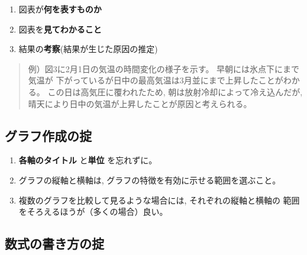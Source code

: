 \documentclass[12pt, ]{jsarticle}
\providecommand{\tightlist}{%
   \setlength{\itemsep}{0pt}\setlength{\parskip}{0pt}}
\begin{document}
\begin{enumerate}
  \begin{enumerate}
  \tightlist
  \item
    図表が\textbf{何を表すものか}
  \item
    図表を\textbf{見てわかること}
  \item
    結果の\textbf{考察}(結果が生じた原因の推定)
  \end{enumerate}

  \begin{quote}
  例）図3に2月1日の気温の時間変化の様子を示す。
  早朝には氷点下にまで気温が
  下がっているが日中の最高気温は3月並にまで上昇したことがわかる。
  この日は高気圧に覆われたため, 朝は放射冷却によって冷え込んだが,
  晴天により日中の気温が上昇したことが原因と考えられる。
  \end{quote}
\end{enumerate}

\hypertarget{ux30b0ux30e9ux30d5ux4f5cux6210ux306eux639f}{%
\subsection{グラフ作成の掟}\label{ux30b0ux30e9ux30d5ux4f5cux6210ux306eux639f}}

\begin{enumerate}
\tightlist
\item
  \textbf{各軸のタイトル} と\textbf{単位} を忘れずに。
\item
  グラフの縦軸と横軸は, グラフの特徴を有効に示せる範囲を選ぶこと。
\item
  複数のグラフを比較して見るような場合には, それぞれの縦軸と横軸の
  範囲をそろえるほうが（多くの場合）良い。
\end{enumerate}

\hypertarget{ux6570ux5f0fux306eux66f8ux304dux65b9ux306eux639f}{%
\subsection{数式の書き方の掟}\label{ux6570ux5f0fux306eux66f8ux304dux65b9ux306eux639f}}
\end{document}

